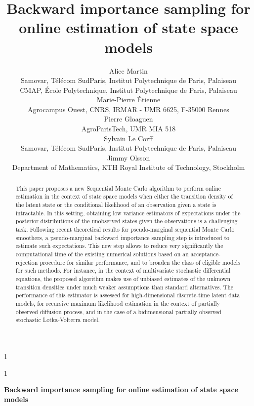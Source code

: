 \documentclass[12pt]{article}
\newcommand{\blind}{1}
\begin{document}
%

\def\spacingset#1{\renewcommand{\baselinestretch}%
{#1}\small\normalsize} \spacingset{1}



\blind
{
  \title{\bf Backward importance sampling for online estimation of state space models}
  \author{Alice Martin\\
     Samovar, T\'el\'ecom SudParis, Institut Polytechnique de Paris, Palaiseau\\
    CMAP, \'Ecole Polytechnique, Institut Polytechnique de Paris, Palaiseau\\
    Marie-Pierre \'Etienne \\
    Agrocampus Ouest, CNRS, IRMAR - UMR 6625, F-35000 Rennes\\ 
Pierre Gloaguen\\
AgroParisTech, UMR MIA 518\\
Sylvain Le Corff\\
Samovar, T\'el\'ecom SudParis, Institut Polytechnique de Paris, Palaiseau\\
Jimmy Olsson\\
Department of Mathematics, KTH Royal Institute of Technology, Stockholm
}
  \maketitle
} \fi

\blind
{
  \bigskip
  \bigskip
  \bigskip
  \begin{center}
    {\LARGE\bf Backward importance sampling for online estimation of state space models}
\end{center}
  \medskip
} \fi

\bigskip
\begin{abstract}
This paper proposes a new Sequential Monte Carlo algorithm to perform online estimation in the context of state space models when either the transition density of the latent state or the conditional likelihood of an observation given a state is intractable. 
In this setting, obtaining low variance estimators of expectations under the posterior distributions of the unobserved states given the observations is a challenging task. 
Following recent theoretical results for pseudo-marginal sequential Monte Carlo smoothers, a pseudo-marginal backward importance sampling step is introduced to estimate such expectations. 
This new step allows to reduce very significantly the computational time  of the existing numerical solutions based on an acceptance-rejection procedure for similar performance, and to broaden the class of eligible models for such methods. 
For instance, in the context of multivariate stochastic differential equations, the proposed algorithm makes use of unbiased estimates of the unknown transition densities under much weaker assumptions than standard alternatives.
 The performance of this estimator is assessed for high-dimensional discrete-time latent data models,  for recursive maximum likelihood estimation in the context of partially observed diffusion process, and  in the case of a bidimensional partially observed stochastic Lotka-Volterra model. 
\end{abstract}
\end{document}

